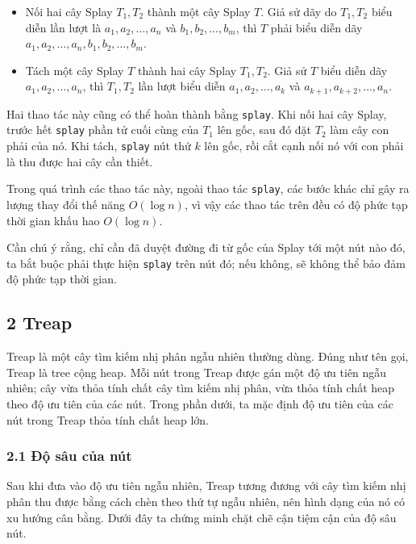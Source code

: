 \documentclass[11pt]{article}
\begin{document}
\begin{itemize}
  \item Nối hai cây Splay \(T_1,T_2\) thành một cây Splay \(T\). Giả sử dãy do
  \(T_1,T_2\) biểu diễn lần lượt là \(a_1,a_2,\ldots,a_n\) và
  \(b_1,b_2,\ldots,b_m\), thì \(T\) phải biểu diễn dãy
  \(a_1,a_2,\ldots,a_n,b_1,b_2,\ldots,b_m\).
  \item Tách một cây Splay \(T\) thành hai cây Splay \(T_1,T_2\). Giả sử \(T\)
  biểu diễn dãy \(a_1,a_2,\ldots,a_n\), thì \(T_1,T_2\) lần lượt biểu diễn
  \(a_1,a_2,\ldots,a_k\) và \(a_{k+1},a_{k+2},\ldots,a_n\).
\end{itemize}

Hai thao tác này cũng có thể hoàn thành bằng \texttt{splay}. Khi nối hai cây
Splay, trước hết \texttt{splay} phần tử cuối cùng của \(T_1\) lên gốc, sau đó
đặt \(T_2\) làm cây con phải của nó. Khi tách, \texttt{splay} nút thứ \(k\) lên
gốc, rồi cắt cạnh nối nó với con phải là thu được hai cây cần thiết.

Trong quá trình các thao tác này, ngoài thao tác \texttt{splay}, các bước khác
chỉ gây ra lượng thay đổi thế năng \(O(\log n)\), vì vậy các thao tác trên đều
có độ phức tạp thời gian khấu hao \(O(\log n)\).

Cần chú ý rằng, chỉ cần đã duyệt đường đi từ gốc của Splay tới một nút nào đó,
ta bắt buộc phải thực hiện \texttt{splay} trên nút đó; nếu không, sẽ không thể
bảo đảm độ phức tạp thời gian.

\subsection*{2 Treap}

Treap là một cây tìm kiếm nhị phân ngẫu nhiên thường dùng. Đúng như tên gọi,
Treap là tree cộng heap. Mỗi nút trong Treap được gán một độ ưu tiên ngẫu
nhiên; cây vừa thỏa tính chất cây tìm kiếm nhị phân, vừa thỏa tính chất heap
theo độ ưu tiên của các nút. Trong phần dưới, ta mặc định độ ưu tiên của các
nút trong Treap thỏa tính chất heap lớn.

\subsubsection*{2.1 Độ sâu của nút}

Sau khi đưa vào độ ưu tiên ngẫu nhiên, Treap tương đương với cây tìm kiếm nhị
phân thu được bằng cách chèn theo thứ tự ngẫu nhiên, nên hình dạng của nó có xu
hướng cân bằng. Dưới đây ta chứng minh chặt chẽ cận tiệm cận của độ sâu nút.
\end{document}

